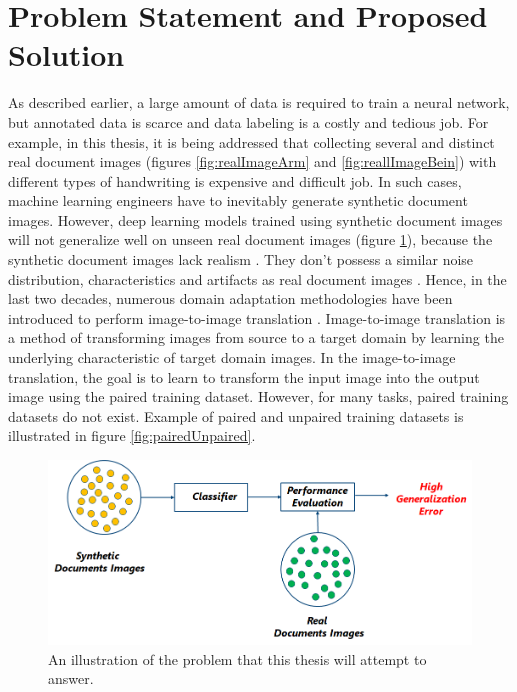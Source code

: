 \section{Problem Statement and Proposed Solution}\label{ProblemStatement}

As described earlier, a large amount of data is required to train a neural network, but annotated data is scarce and data labeling is a costly and tedious job. For example, in this thesis, it is being addressed that collecting several and distinct real document images (figures \ref{fig:realImageArm} and \ref{fig:reallImageBein}) with different types of handwriting is expensive and difficult job. In such cases, machine learning engineers have to inevitably generate synthetic document images. However, deep learning models trained using synthetic document images will not generalize well on unseen real document images (figure \ref{fig:Problem}), because the synthetic document images lack realism  \cite{8978087}. They don't possess a similar noise distribution, characteristics and artifacts as real document images \cite{8978087}. Hence, in the last two decades, numerous domain adaptation methodologies have been introduced to perform image-to-image translation \cite{8978011}. Image-to-image translation is a method of transforming images from source to a target domain by learning the underlying characteristic of target domain images. In the image-to-image translation, the goal is to learn to transform the input image into the output image using the paired training dataset. However, for many tasks, paired training datasets do not exist. Example of paired and unpaired training datasets is illustrated in figure \ref{fig:pairedUnpaired}. 


\begin{figure}[H]
        \begin{center}
	    \includegraphics[scale=0.60]{images/Introduction/Problem.png}
	    \caption[An illustration of the problem that this thesis will attempt to answer.]{An illustration of the problem that this thesis will attempt to answer.}
	    \label{fig:Problem}
	    \end{center}
\end{figure}



